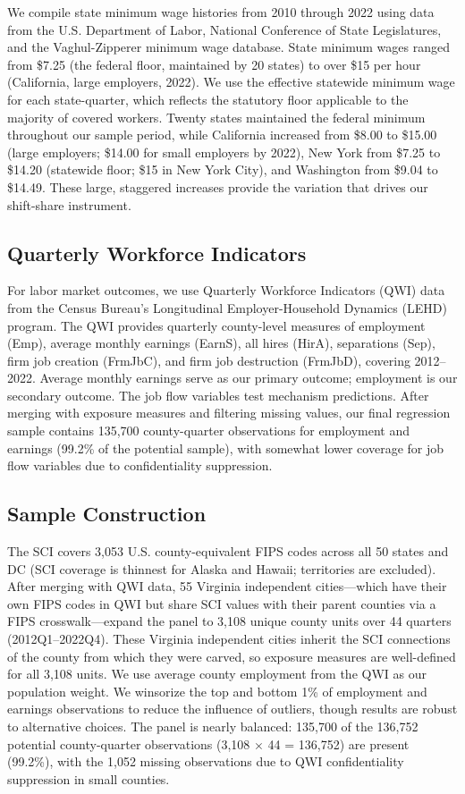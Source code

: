 \documentclass[12pt]{article}
\begin{document}
We compile state minimum wage histories from 2010 through 2022 using data from the U.S. Department of Labor, National Conference of State Legislatures, and the Vaghul-Zipperer minimum wage database. State minimum wages ranged from \$7.25 (the federal floor, maintained by 20 states) to over \$15 per hour (California, large employers, 2022). We use the effective statewide minimum wage for each state-quarter, which reflects the statutory floor applicable to the majority of covered workers. Twenty states maintained the federal minimum throughout our sample period, while California increased from \$8.00 to \$15.00 (large employers; \$14.00 for small employers by 2022), New York from \$7.25 to \$14.20 (statewide floor; \$15 in New York City), and Washington from \$9.04 to \$14.49. These large, staggered increases provide the variation that drives our shift-share instrument.

\subsection{Quarterly Workforce Indicators}

For labor market outcomes, we use Quarterly Workforce Indicators (QWI) data from the Census Bureau's Longitudinal Employer-Household Dynamics (LEHD) program. The QWI provides quarterly county-level measures of employment (Emp), average monthly earnings (EarnS), all hires (HirA), separations (Sep), firm job creation (FrmJbC), and firm job destruction (FrmJbD), covering 2012--2022. Average monthly earnings serve as our primary outcome; employment is our secondary outcome. The job flow variables test mechanism predictions. After merging with exposure measures and filtering missing values, our final regression sample contains 135,700 county-quarter observations for employment and earnings (99.2\% of the potential sample), with somewhat lower coverage for job flow variables due to confidentiality suppression.

\subsection{Sample Construction}

The SCI covers 3,053 U.S. county-equivalent FIPS codes across all 50 states and DC (SCI coverage is thinnest for Alaska and Hawaii; territories are excluded). After merging with QWI data, 55 Virginia independent cities---which have their own FIPS codes in QWI but share SCI values with their parent counties via a FIPS crosswalk---expand the panel to 3,108 unique county units over 44 quarters (2012Q1--2022Q4). These Virginia independent cities inherit the SCI connections of the county from which they were carved, so exposure measures are well-defined for all 3,108 units. We use average county employment from the QWI as our population weight. We winsorize the top and bottom 1\% of employment and earnings observations to reduce the influence of outliers, though results are robust to alternative choices. The panel is nearly balanced: 135,700 of the 136,752 potential county-quarter observations (3,108 $\times$ 44 = 136,752) are present (99.2\%), with the 1,052 missing observations due to QWI confidentiality suppression in small counties.
\end{document}
